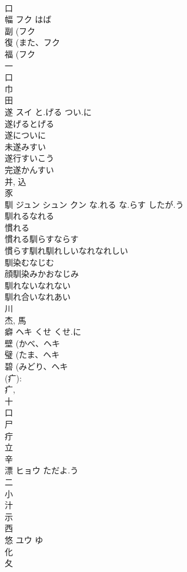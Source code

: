 \documentclass[8pt]{extreport}
\begin{document}
\begin{CJK}{UTF8}{min}
\\	口 
\\	幅	フク	はば	
\\	副 (フク 
\\	復 (また、フク 
\\	福 (フク 
\\	一 
\\	口 
\\	巾 
\\	田 
\\	遂	スイ	と.げる つい.に	
\\	遂げるとげる
\\	遂についに
\\	未遂みすい
\\	遂行すいこう
\\	完遂かんすい
\\	并, 込 
\\	豕 
\\	馴	ジュン シュン クン	な.れる な.らす したが.う	
\\	馴れるなれる
\\	慣れる
\\	慣れる馴らすならす
\\	慣らす馴れ馴れしいなれなれしい
\\	馴染むなじむ
\\	顔馴染みかおなじみ
\\	馴れないなれない
\\	馴れ合いなれあい
\\	川 
\\	杰, 馬 
\\	癖	ヘキ	くせ くせ.に	
\\	壁 (かべ、ヘキ 
\\	璧 (たま、ヘキ 
\\	碧 (みどり、ヘキ 
\\	(疒): 
\\	疒, 
\\	十 
\\	口 
\\	尸 
\\	疔 
\\	立 
\\	辛 
\\	漂	ヒョウ	ただよ.う	
\\	二 
\\	小 
\\	汁 
\\	示 
\\	西 
\\	悠	ユウ	ゆ	
\\	化 
\\	夂 

\end{CJK}
\end{document}
